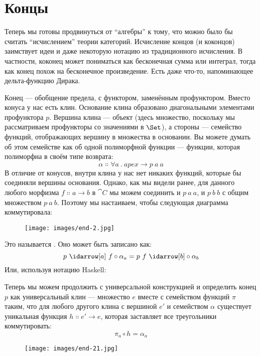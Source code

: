 \section{Концы}

Теперь мы готовы продвинуться от ``алгебры'' к тому, что можно было бы считать
``исчислением'' теории категорий. Исчисление концов (и коконцов)
заимствует идеи и даже некоторую нотацию из традиционного исчисления. В
частности, коконец может пониматься как бесконечная сумма или
интеграл, тогда как конец похож на бесконечное произведение. Есть
даже что-то, напоминающее дельта-функцию Дирака.

Конец --- обобщение предела, с функтором, заменённым
профунктором. Вместо конуса у нас есть клин. Основание клина
образовано диагональными элементами профунктора $p$. Вершина
клина --- объект (здесь множество, поскольку мы рассматриваем
профункторы со значениями в $\Set$), а стороны --- семейство
функций, отображающих вершину в множества в основании. Вы можете думать об
этом семействе как об одной полиморфной функции --- функции, которая
полиморфна в своём типе возврата:
\[\alpha \Colon \forall a\ .\ \mathit{apex} \to p\ a\ a\]
В отличие от конусов, внутри клина у нас нет никаких функций, которые бы
соединяли вершины основания. Однако, как мы видели ранее, для данного любого
морфизма $f \Colon a \to b$ в $\cat{C}$ мы можем соединить и
$p\ a\ a$, и $p\ b\ b$ с общим множеством
$p\ a\ b$. Поэтому мы настаиваем, чтобы следующая диаграмма
коммутировала:

\begin{figure}[H]
  \centering
  \texttt{[image: images/end-2.jpg]}
\end{figure}

\noindent
Это называется . Оно может быть записано как:
\[p\ \idarrow[a]\ f \circ \alpha_a = p\ f\ \idarrow[b] \circ \alpha_b\]
Или, используя нотацию Haskell:

Теперь мы можем продолжить с универсальной конструкцией и определить конец
$p$ как универсальный клин --- множество $e$ вместе с
семейством функций $\pi$ таким, что для любого другого клина с
вершиной $e'$ и семейством $\alpha$ существует уникальная функция
$h \Colon e' \to e$, которая заставляет все треугольники коммутировать:
\[\pi_a \circ h = \alpha_a\]

\begin{figure}[H]
  \centering
  \texttt{[image: images/end-21.jpg]}
\end{figure}

